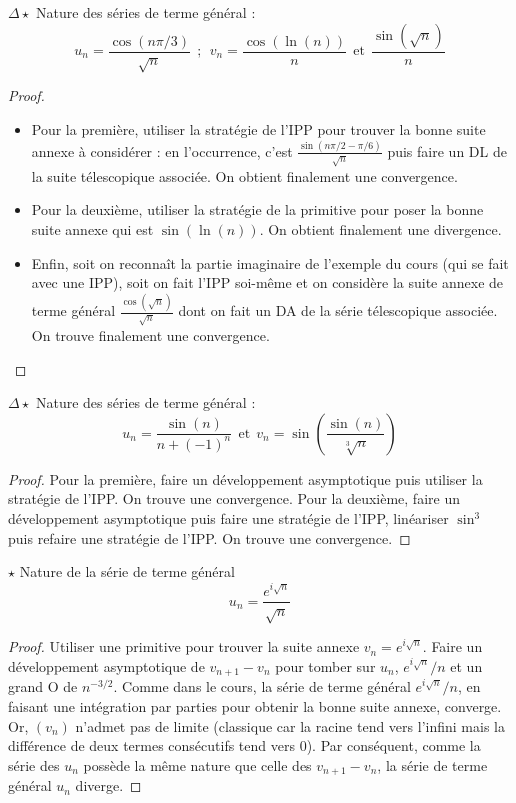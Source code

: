\documentclass[french,a4paper]{article}
\theoremstyle{plain}
\theoremstyle{definition}
\theoremstyle{remark}
\begin{document}
\begin{ex}{$\Delta\star$}
	Nature des séries de terme général :
	$$u_n=\frac{\cos(n\pi/3)}{\sqrt{n}}\ \ ; \ \ v_n=\frac{\cos(\ln(n))}{n}\ \ \text{et} \ \ \frac{\sin(\sqrt{n})}{n}$$
\end{ex}
\begin{proof}
	\begin{itemize}
		\item Pour la première, utiliser la stratégie de l'IPP pour trouver la bonne suite annexe à considérer : en l'occurrence, c'est $\displaystyle\frac{\sin(n\pi/2-\pi/6)}{\sqrt{n}}$ puis faire un DL de la suite télescopique associée. On obtient finalement une convergence.
		\item Pour la deuxième, utiliser la stratégie de la primitive pour poser la bonne suite annexe qui est $\sin(\ln(n))$. On obtient finalement une divergence.
		\item Enfin, soit on reconnaît la partie imaginaire de l'exemple du cours (qui se fait avec une IPP), soit on fait l'IPP soi-même et on considère la suite annexe de terme général $\displaystyle\frac{\cos(\sqrt{n})}{\sqrt{n}}$ dont on fait un DA de la série télescopique associée. On trouve finalement une convergence.
	\end{itemize}
\end{proof}

\begin{ex}{$\Delta\star$}
	Nature des séries de terme général : 
	$$u_n=\frac{\sin(n)}{n+(-1)^n}\ \ \text{et} \ \ v_n=\sin\left(\frac{\sin(n)}{\sqrt[3]{n}}\right)$$
\end{ex}
\begin{proof}
	Pour la première, faire un développement asymptotique puis utiliser la stratégie de l'IPP. On trouve une convergence. Pour la deuxième, faire un développement asymptotique puis faire une stratégie de l'IPP, linéariser $\sin^3$ puis refaire une stratégie de l'IPP. On trouve une convergence.
\end{proof}

\begin{ex}{$\star$}
	Nature de la série de terme général $$u_n=\frac{e^{i\sqrt{n}}}{\sqrt{n}}$$
\end{ex}
\begin{proof}
	Utiliser une primitive pour trouver la suite annexe $v_n=e^{i\sqrt{n}}$. Faire un développement asymptotique de $v_{n+1}-v_n$ pour tomber sur $u_n$, $e^{i\sqrt{n}}/n$ et un grand O de $n^{-3/2}$. Comme dans le cours, la série de terme général $e^{i\sqrt{n}}/n$, en faisant une intégration par parties pour obtenir la bonne suite annexe, converge. Or, $(v_n)$ n'admet pas de limite (classique car la racine tend vers l'infini mais la différence de deux termes consécutifs tend vers 0). Par conséquent, comme la série des $u_n$ possède la même nature que celle des $v_{n+1}-v_n$, la série de terme général $u_n$ diverge.
\end{proof}
\end{document}

